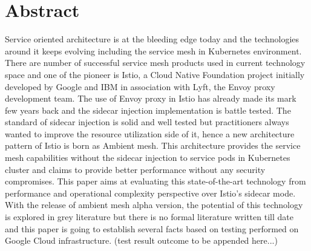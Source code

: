 \section{Abstract}
Service oriented architecture is at the bleeding edge today and the technologies around it keeps evolving including the service mesh in Kubernetes environment. There are number of successful service mesh products used in current technology space and one of the pioneer is Istio, a Cloud Native Foundation project initially developed by Google and IBM in association with Lyft, the Envoy proxy development team. The use of Envoy proxy in Istio has already made its mark few years back and the sidecar injection implementation is battle tested. The standard of sidecar injection is solid and well tested but practitioners always wanted to improve the resource utilization side of it, hence a new architecture pattern of Istio is born as Ambient mesh. This architecture provides the service mesh capabilities without the sidecar injection to service pods in Kubernetes cluster and claims to provide better performance without any security compromises. This paper aims at evaluating this state-of-the-art technology from performance and operational complexity perspective over Istio's sidecar mode. With the release of ambient mesh alpha version, the potential of this technology is explored in grey literature but there is no formal literature written till date and this paper is going to establish several facts based on testing performed on Google Cloud infrastructure. (test result outcome to be appended here...)